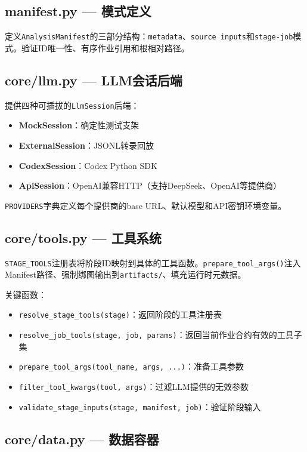 \documentclass[12pt,a4paper]{ctexart}
\begin{document}
\subsection{manifest.py — 模式定义}

定义\texttt{AnalysisManifest}的三部分结构：\texttt{metadata}、\texttt{source inputs}和\texttt{stage-job}模式。验证ID唯一性、有序作业引用和根相对路径。

\subsection{core/llm.py — LLM会话后端}

提供四种可插拔的\texttt{LlmSession}后端：
\begin{itemize}[leftmargin=*]
    \item \textbf{MockSession}：确定性测试支架
    \item \textbf{ExternalSession}：JSONL转录回放
    \item \textbf{CodexSession}：Codex Python SDK
    \item \textbf{ApiSession}：OpenAI兼容HTTP（支持DeepSeek、OpenAI等提供商）
\end{itemize}

\texttt{PROVIDERS}字典定义每个提供商的base URL、默认模型和API密钥环境变量。

\subsection{core/tools.py — 工具系统}

\texttt{STAGE\_TOOLS}注册表将阶段ID映射到具体的工具函数。\texttt{prepare\_tool\_args()}注入Manifest路径、强制绑图输出到\texttt{artifacts/}、填充运行时元数据。

关键函数：
\begin{itemize}[leftmargin=*]
    \item \texttt{resolve\_stage\_tools(stage)}：返回阶段的工具注册表
    \item \texttt{resolve\_job\_tools(stage, job, params)}：返回当前作业合约有效的工具子集
    \item \texttt{prepare\_tool\_args(tool\_name, args, ...)}：准备工具参数
    \item \texttt{filter\_tool\_kwargs(tool, args)}：过滤LLM提供的无效参数
    \item \texttt{validate\_stage\_inputs(stage, manifest, job)}：验证阶段输入
\end{itemize}

\subsection{core/data.py — 数据容器}
\end{document}
